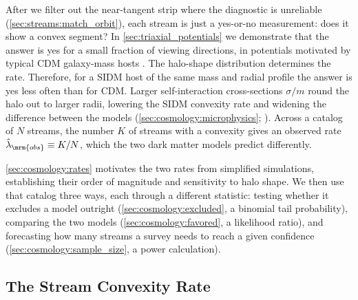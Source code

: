\documentclass[linenumbers,twocolumn]{aastex701}
\newcommand{\lamObs}{\ensuremath{\hat{\lambda}_{\mrm{obs}}}}  %
\begin{document}
    After we filter out the near-tangent strip where the diagnostic is unreliable (\autoref{sec:streams:match_orbit}), each stream is just a yes-or-no measurement: does it show a convex segment? %
    In \autoref{sec:triaxial_potentials} we demonstrate that the answer is yes for a small fraction of viewing directions, in potentials motivated by typical \gls{CDM} galaxy-mass hosts \citep{Allgood+:2006:ShapeDarkMatter,Vera-Ciro+:2011:ShapeDarkMatter,Giocoli+:2026:AIDATNGProject3D}. %
    The halo-shape distribution determines the rate. %
    Therefore, for a \gls{SIDM} host of the same mass and radial profile the answer is yes less often than for \gls{CDM}. %
    Larger self-interaction cross-sections $\sigma/m$ round the halo out to larger radii, lowering the \gls{SIDM} convexity rate and widening the difference between the models (\autoref{sec:cosmology:microphysics}; \citealt{Brinckmann+:2018:StructureAssemblyHistory,Fischer+:2024:CosmologicalIdealizedSimulations}). %
    Across a catalog of $N$ streams, the number $K$ of streams with a convexity gives an observed rate $\lamObs \equiv K/N$, which the two dark matter models predict differently. %

    \autoref{sec:cosmology:rates} motivates the two rates from simplified simulations, establishing their order of magnitude and sensitivity to halo shape. %
    We then use that catalog three ways, each through a different statistic: %
    testing whether it excludes a model outright (\autoref{sec:cosmology:excluded}, a binomial tail probability), %
    comparing the two models (\autoref{sec:cosmology:favored}, a likelihood ratio), %
    and forecasting how many streams a survey needs to reach a given confidence (\autoref{sec:cosmology:sample_size}, a power calculation). %

    \subsection{The Stream Convexity Rate}\label{sec:cosmology:rates}
\end{document}
